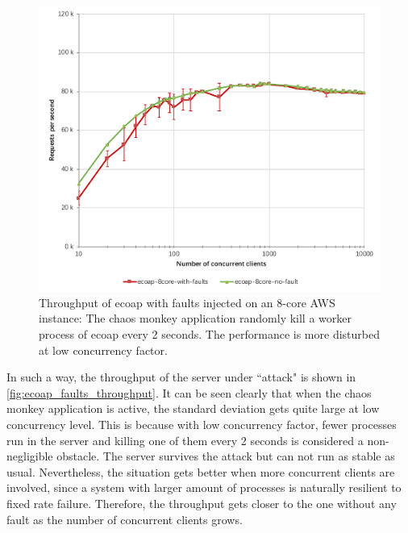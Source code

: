 \begin{figure}[!htbp]
\centering
\includegraphics[scale=0.7]{ecoap_faults_throughput}
\caption[Throughput of ecoap with faults injected on an 8-core AWS instance]{Throughput of ecoap with faults injected on an 8-core AWS instance: The chaos monkey application randomly kill a worker process of ecoap every 2 seconds. The performance is more disturbed at low concurrency factor.}
\label{fig:ecoap_faults_throughput}
\end{figure}

In such a way, the throughput of the server under ``attack" is shown in \autoref{fig:ecoap_faults_throughput}. It can be seen clearly that when the chaos monkey application is active, the standard deviation gets quite large at low concurrency level. This is because with low concurrency factor, fewer processes run in the server and killing one of them every 2 seconds is considered a non-negligible obstacle. The server survives the attack but can not run as stable as usual. Nevertheless, the situation gets better when more concurrent clients are involved, since a system with larger amount of processes is naturally resilient to fixed rate failure. Therefore, the throughput gets closer to the one without any fault as the number of concurrent clients grows. 

